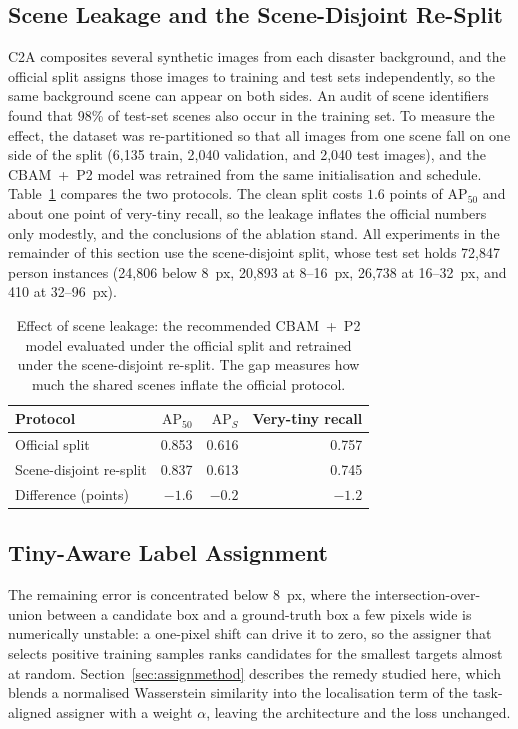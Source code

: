 \subsection{Scene Leakage and the Scene-Disjoint Re-Split}
C2A composites several synthetic images from each disaster background, and the
official split assigns those images to training and test sets independently, so
the same background scene can appear on both sides. An audit of scene identifiers
found that 98\% of test-set scenes also occur in the training set. To measure the
effect, the dataset was re-partitioned so that all images from one scene fall on
one side of the split (6{,}135 train, 2{,}040 validation, and 2{,}040 test
images), and the CBAM~+~P2 model was retrained from the same initialisation and
schedule. Table~\ref{tab:leak} compares the two protocols. The clean split costs
$1.6$ points of $\mathrm{AP}_{50}$ and about one point of very-tiny recall, so
the leakage inflates the official numbers only modestly, and the conclusions of
the ablation stand. All experiments in the remainder of this section use the
scene-disjoint split, whose test set holds 72{,}847 person instances (24{,}806
below 8~px, 20{,}893 at 8--16~px, 26{,}738 at 16--32~px, and 410 at 32--96~px).

\begin{table}[tbp]
  \centering
  \caption{Effect of scene leakage: the recommended CBAM~+~P2 model evaluated
  under the official split and retrained under the scene-disjoint re-split. The
  gap measures how much the shared scenes inflate the official protocol.}
  \label{tab:leak}
  \begin{tabular}{@{}l r r r@{}}
    \toprule
    Protocol & $\mathrm{AP}_{50}$ & $\mathrm{AP}_S$ & Very-tiny recall \\
    \midrule
    Official split          & 0.853 & 0.616 & 0.757 \\
    Scene-disjoint re-split & 0.837 & 0.613 & 0.745 \\
    Difference (points)     & $-1.6$ & $-0.2$ & $-1.2$ \\
    \bottomrule
  \end{tabular}
\end{table}

\subsection{Tiny-Aware Label Assignment}
\label{sec:assignresults}
The remaining error is concentrated below 8~px, where the intersection-over-union
between a candidate box and a ground-truth box a few pixels wide is numerically
unstable: a one-pixel shift can drive it to zero, so the assigner that selects
positive training samples ranks candidates for the smallest targets almost at
random. Section~\ref{sec:assignmethod} describes the remedy studied here, which blends a
normalised Wasserstein similarity into the localisation term of the task-aligned
assigner with a weight $\alpha$, leaving the architecture and the loss unchanged.

